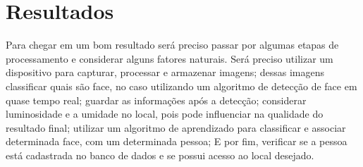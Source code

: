 
\chapter{Resultados}\label{cap:resultados}

Para chegar em um bom resultado será preciso passar por algumas etapas de 
processamento e considerar alguns fatores naturais. Será preciso utilizar 
um dispositivo para capturar, processar e armazenar imagens; dessas imagens 
classificar quais são face, no caso utilizando um algoritmo de detecção de 
face em quase tempo real; guardar as informações após a detecção; considerar 
luminosidade e a umidade no local, pois pode influenciar na qualidade do 
resultado final; utilizar um algoritmo de aprendizado para classificar e 
associar determinada face, com um determinada pessoa; E por fim, verificar 
se a pessoa está cadastrada no banco de dados e se possui acesso ao 
local desejado.
